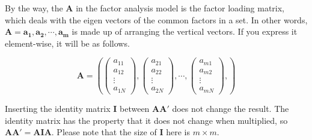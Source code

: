 \documentclass{ltjsbook}
\begin{document}
By the way, the $\bm{A}$ in the factor analysis model is the factor loading matrix, which deals with the eigen vectors of the common factors in a set. In other words, $\bm{A} = \bm{a_1,a_2,\cdots,a_m}$ is made up of arranging the vertical vectors. If you express it element-wise, it will be as follows.

\[
	\bm{A} = \left (
	\begin{pmatrix}  a_{11}\\a_{12}\\\vdots\\ a_{1N} \end{pmatrix},
	\begin{pmatrix}  a_{21}\\a_{22}\\\vdots\\ a_{2N} \end{pmatrix},
	\cdots,
	\begin{pmatrix}  a_{m1}\\a_{m2}\\\vdots\\ a_{mN} \end{pmatrix},
	\right )
\]

Inserting the identity matrix $\bm{I}$ between $\bm{AA'}$ does not change the result. The identity matrix has the property that it does not change when multiplied, so $\bm{AA'}=\bm{AIA}$. Please note that the size of $\bm{I}$ here is $m \times m$.
\end{document}
